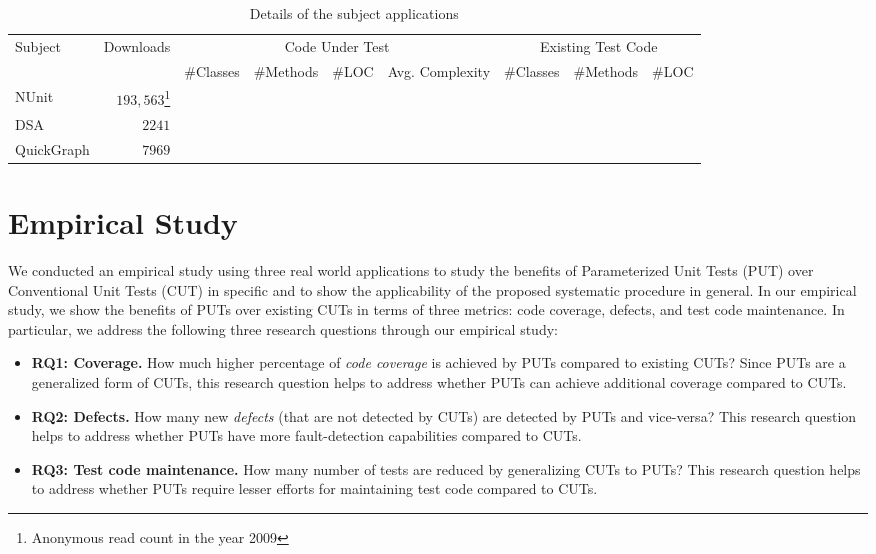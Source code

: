 \begin{table*}[t]%
\centering
\begin{minipage}{\textwidth}
\centering
\begin{tabular}{|l|r|r|r|r|r|r|r|r|}
\hline
Subject 		& Downloads 	& \multicolumn{4}{|c|}{Code Under Test} 					&	\multicolumn{3}{|c|}{Existing Test Code} \\ \cline{3-9}
						& 						&	\#Classes	&	\#Methods	& \#LOC	& Avg. Complexity	&	\#Classes	&	\#Methods &	\#LOC		\\ \hline\hline
NUnit				&		$193,563$\footnote{Anonymous read count in the year 2009}
													&						&						&				&									&						&						&					\\ \hline
DSA					&		$2241$		&						&						&				&									&						&						&					\\ \hline		
QuickGraph	&		$7969$ 		&						&						&				&									&						&						&					\\ \hline
\end{tabular}
\end{minipage}
\caption{Details of the subject applications}
\label{tab:subjectmetrics}
\end{table*}

\section{Empirical Study}

We conducted an empirical study using three real world applications to study the benefits of Parameterized Unit Tests (PUT) over Conventional Unit Tests (CUT) in specific and to show the applicability of the proposed systematic procedure in general. In our empirical study, we show the benefits of PUTs over existing CUTs in terms of three metrics: code coverage, defects, and test code maintenance. In particular, we address the following three research questions through our empirical study:

\begin{itemize}
	\item \textbf{RQ1: Coverage.} How much higher percentage of \emph{code coverage} is achieved by PUTs compared to existing CUTs? Since PUTs are a generalized form of CUTs, this research question helps to address whether PUTs can achieve additional coverage compared to CUTs.
	\item \textbf{RQ2: Defects.} How many new \emph{defects} (that are not detected by CUTs) are detected by PUTs and vice-versa? This research question helps to address whether PUTs have more fault-detection capabilities compared to CUTs.
	\item \textbf{RQ3: Test code maintenance.} How many number of tests are reduced by generalizing CUTs to PUTs? This research question helps to address whether PUTs require lesser efforts for maintaining test code compared to CUTs.
\end{itemize}

